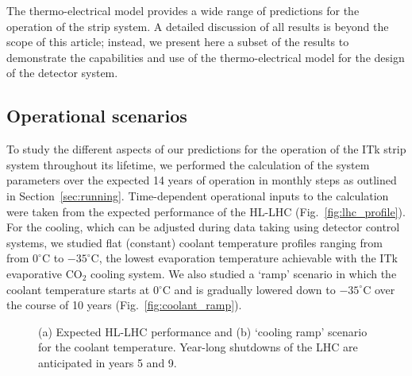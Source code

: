 
The thermo-electrical model provides a wide range of predictions for the operation of the strip system. A detailed discussion of all results is beyond the scope of this article; instead, we present here a subset of the results to demonstrate the capabilities and use of the thermo-electrical model for the design of the detector system.

\subsection{Operational scenarios}\label{sec:opscenarios}
To study the different aspects of our predictions for the operation of the ITk strip system throughout its lifetime, we performed the calculation of the system parameters over the expected 14 years of operation in monthly steps as outlined in Section~\ref{sec:running}. Time-dependent operational inputs to the calculation were taken from the expected performance of the HL-LHC (Fig.~\ref{fig:lhc_profile}). For the cooling, which can be adjusted during data taking using detector control systems, we studied flat (constant) coolant temperature profiles ranging from from $0^\circ$C to $-35^\circ$C, the lowest evaporation temperature achievable with the ITk evaporative CO$_2$ cooling system. We also studied a `ramp' scenario in which the coolant temperature starts at 0$^\circ$C and is gradually lowered down to $-35^\circ$C over the course of 10 years (Fig.~\ref{fig:coolant_ramp}).

\begin{figure}[ht]
\centering
{}\quad\quad
{}
\caption{(a) Expected HL-LHC performance and (b) `cooling ramp' scenario for the coolant temperature. Year-long shutdowns of the LHC are anticipated in years 5 and 9.}
\label{fig:opscenarios}
\end{figure}

